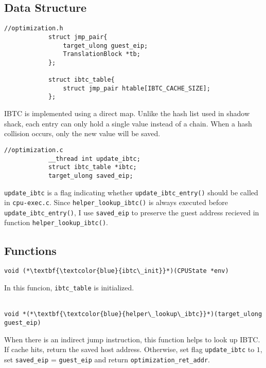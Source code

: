 \documentclass[12pt]{article}
\begin{document}
    \subsection{Data Structure}
        \begin{lstlisting}[style=Structure]
            //optimization.h
            struct jmp_pair{
                target_ulong guest_eip;
                TranslationBlock *tb;
            };

            struct ibtc_table{
                struct jmp_pair htable[IBTC_CACHE_SIZE];
            };
        \end{lstlisting}
        IBTC is implemented using a direct map.
        Unlike the hash list used in shadow shack, each entry can only hold a single value instead of a chain.
        When a hash collision occurs, only the new value will be saved.
        \\
        \begin{lstlisting}[style=Structure]
            //optimization.c
            __thread int update_ibtc;
            struct ibtc_table *ibtc;
            target_ulong saved_eip;
        \end{lstlisting}
        \verb|update_ibtc| is a flag indicating whether \verb|update_ibtc_entry()| should be called in \verb|cpu-exec.c|.
        Since \verb|helper_lookup_ibtc()| is always executed before \verb|update_ibtc_entry()|,
        I use \verb|saved_eip| to preserve the guest address recieved in function \verb|helper_lookup_ibtc()|.

    \newpage

    \subsection{Functions}
        \begin{lstlisting}[style=Function]
            void (*\textbf{\textcolor{blue}{ibtc\_init}}*)(CPUState *env)
        \end{lstlisting}
        In this funcion, \verb|ibtc_table| is initialized.
        \\\\
        \begin{lstlisting}[style=Function]
            void *(*\textbf{\textcolor{blue}{helper\_lookup\_ibtc}}*)(target_ulong guest_eip)
        \end{lstlisting}
        When there is an indirect jump instruction, this function helps to look up IBTC.
        If cache hits, return the saved host address.
        Otherwise, set flag \verb|update_ibtc| to $1$, set \verb|saved_eip| = \verb|guest_eip| and return \verb|optimization_ret_addr|.
\end{document}
